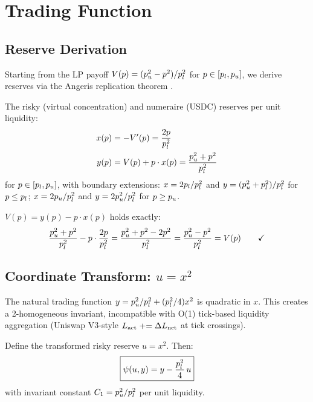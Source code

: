 
\section{Trading Function}\label{sec:trading-function}

\subsection{Reserve Derivation}

Starting from the LP payoff $V(p) = (p_u^2 - p^2)/p_l^2$ for $p \in [p_l, p_u]$,
we derive reserves via the Angeris replication theorem \cite{angeris2021replicating}.

\begin{definition}[Reserves]\label{def:reserves}
The risky (virtual concentration) and numeraire (USDC) reserves per unit liquidity:
\begin{align}
  x(p) &= -V'(p) = \frac{2p}{p_l^2} \label{eq:risky-reserve} \\
  y(p) &= V(p) + p \cdot x(p) = \frac{p_u^2 + p^2}{p_l^2} \label{eq:numeraire-reserve}
\end{align}
for $p \in [p_l, p_u]$, with boundary extensions:
$x = 2p_l/p_l^2$ and $y = (p_u^2 + p_l^2)/p_l^2$ for $p \leq p_l$;
$x = 2p_u/p_l^2$ and $y = 2p_u^2/p_l^2$ for $p \geq p_u$.
\end{definition}

\begin{proposition}\label{prop:reserve-verify}
$V(p) = y(p) - p \cdot x(p)$ holds exactly:
\[
  \frac{p_u^2 + p^2}{p_l^2} - p \cdot \frac{2p}{p_l^2}
  = \frac{p_u^2 + p^2 - 2p^2}{p_l^2}
  = \frac{p_u^2 - p^2}{p_l^2}
  = V(p) \qquad\checkmark
\]
\end{proposition}

\subsection{Coordinate Transform: $u = x^2$}\label{subsec:coordinate-transform}

The natural trading function $y = p_u^2/p_l^2 + (p_l^2/4)x^2$ is quadratic in $x$.
This creates a 2-homogeneous invariant, incompatible with O(1) tick-based
liquidity aggregation (Uniswap V3-style $L_{\text{act}} \mathrel{+}= \Delta L_{\text{net}}$ at tick crossings).

\begin{definition}[Linearization]\label{def:linearization}
Define the transformed risky reserve $u = x^2$. Then:
\begin{equation}\label{eq:linearized-invariant}
  \boxed{\psi(u, y) = y - \frac{p_l^2}{4}\, u}
\end{equation}
with invariant constant $C_1 = p_u^2/p_l^2$ per unit liquidity.
\end{definition}

